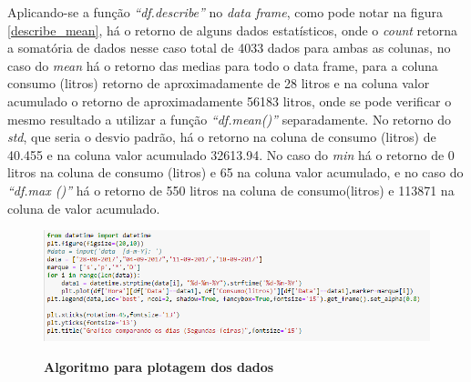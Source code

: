\par Aplicando-se a função \emph{“df.describe”} no \emph{data frame}, como pode notar na figura \ref{describe_mean}, há o retorno de alguns dados estatísticos, onde o \emph{count} retorna a somatória de dados nesse caso total de 4033 dados para ambas as colunas, no caso do\emph{ mean} há o retorno das medias para todo o data frame, para a coluna consumo (litros) retorno de aproximadamente de 28 litros e na coluna valor acumulado o retorno de aproximadamente 56183 litros, onde se pode verificar o mesmo resultado a utilizar a função \emph{“df.mean()” } separadamente. No retorno do \emph{std}, que seria o desvio padrão, há o retorno na coluna de consumo (litros) de 40.455 e na coluna valor acumulado 32613.94. No caso do \emph{min} há o retorno de 0 litros na coluna de consumo (litros) e 65 na coluna valor acumulado, e no caso do \emph{“df.max ()”} há o retorno de 550 litros na coluna de consumo(litros) e 113871 na coluna de valor acumulado.

\begin{figure}[ht]
	\caption{\textbf{Algoritmo para plotagem dos dados}}
	\centering
		\includegraphics[width=\textwidth,height=\textheight , keepaspectratio]{figuras/codigograficoempython}
		\label{codigo_plotagem}
\end{figure}

